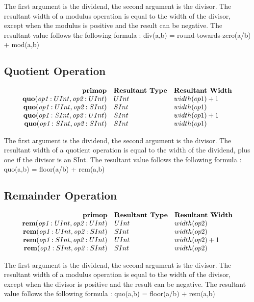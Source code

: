 \documentclass[12pt]{article}
\begin{document}
The first argument is the dividend, the second argument is the divisor.
The resultant width of a modulus operation is equal to the width of the divisor, except when the modulus is positive and the result can be negative.
The resultant value follows the following formula : div(a,b) = round-towards-zero(a/b) + mod(a,b)

\subsection{Quotient Operation}
\[
\begin{array}{rll}
\text{\bf primop} & \text{\bf Resultant Type} & \text{\bf Resultant Width} \\
\text{\bf quo}(\text{\em op1}:UInt, \text{\em op2}:UInt) &   UInt & width(op1) + 1 \\
\text{\bf quo}(\text{\em op1}:UInt, \text{\em op2}:SInt) &   SInt & width(op1)     \\
\text{\bf quo}(\text{\em op1}:SInt, \text{\em op2}:UInt) &   SInt & width(op1) + 1 \\
\text{\bf quo}(\text{\em op1}:SInt, \text{\em op2}:SInt) &   SInt & width(op1)     \\
\end{array}
\]

The first argument is the dividend, the second argument is the divisor.
The resultant width of a quotient operation is equal to the width of the dividend, plus one if the divisor is an SInt.
The resultant value follows the following formula : quo(a,b) = floor(a/b) + rem(a,b)

\subsection{Remainder Operation}
\[
\begin{array}{rll}
\text{\bf primop} & \text{\bf Resultant Type} & \text{\bf Resultant Width} \\
\text{\bf rem}(\text{\em op1}:UInt, \text{\em op2}:UInt) &   UInt & width(op2)     \\
\text{\bf rem}(\text{\em op1}:UInt, \text{\em op2}:SInt) &   SInt & width(op2)     \\
\text{\bf rem}(\text{\em op1}:SInt, \text{\em op2}:UInt) &   UInt & width(op2) + 1 \\
\text{\bf rem}(\text{\em op1}:SInt, \text{\em op2}:SInt) &   SInt & width(op2)     \\
\end{array}
\]

The first argument is the dividend, the second argument is the divisor.
The resultant width of a modulus operation is equal to the width of the divisor, except when the divisor is positive and the result can be negative.
The resultant value follows the following formula : quo(a,b) = floor(a/b) + rem(a,b)
\end{document}
